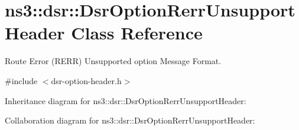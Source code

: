 \hypertarget{classns3_1_1dsr_1_1DsrOptionRerrUnsupportHeader}{}\section{ns3\+:\+:dsr\+:\+:Dsr\+Option\+Rerr\+Unsupport\+Header Class Reference}
\label{classns3_1_1dsr_1_1DsrOptionRerrUnsupportHeader}


Route Error (R\+E\+RR) Unsupported option Message Format.  




{\ttfamily \#include $<$dsr-\/option-\/header.\+h$>$}



Inheritance diagram for ns3\+:\+:dsr\+:\+:Dsr\+Option\+Rerr\+Unsupport\+Header\+:


Collaboration diagram for ns3\+:\+:dsr\+:\+:Dsr\+Option\+Rerr\+Unsupport\+Header\+:
